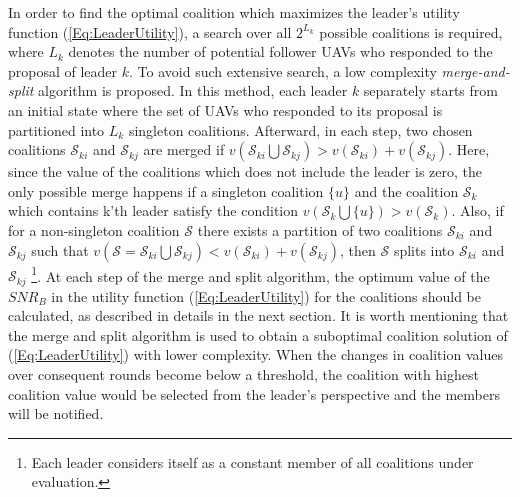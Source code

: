 \documentclass[conference]{IEEEtran}
\theoremstyle{remark}
\theoremstyle{lemma}
\begin{document}

In order to find the optimal coalition which maximizes the leader's utility function (\ref{Eq:LeaderUtility}), a search over all $2^{L_k}$ possible coalitions is required, where $L_k$ denotes the number of potential follower UAVs who responded to the proposal of leader $k$. To avoid such extensive search, a low complexity \textit{merge-and-split} algorithm is proposed. In this method, each leader $k$ separately starts from an initial state where the set of UAVs who responded to its proposal is partitioned into $L_k$ singleton coalitions.
Afterward, in each step, two chosen coalitions $\mathcal{S}_{ki}$ and $\mathcal{S}_{kj}$ are merged if $v(\mathcal{S}_{ki} \bigcup \mathcal{S}_{kj}) > v(\mathcal{S}_{ki}) + v(\mathcal{S}_{kj})$. Here, since the value of the coalitions which does not include the leader is zero, the only possible merge happens if a singleton coalition $\{u\}$ and the coalition $\mathcal{S}_k$ which contains k'th leader satisfy the condition $v(\mathcal{S}_k \bigcup \{u\}) > v(\mathcal{S}_k) $. Also, if for a non-singleton coalition $\mathcal{S}$ there exists a partition of two coalitions $\mathcal{S}_{ki}$ and $\mathcal{S}_{kj}$ such that $v(\mathcal{S}= \mathcal{S}_{ki} \bigcup \mathcal{S}_{kj}) < v(\mathcal{S}_{ki}) + v(\mathcal{S}_{kj})$, then $\mathcal{S}$ splits into $\mathcal{S}_{ki}$ and $\mathcal{S}_{kj}$ \footnote{Each leader considers itself as a constant member of all coalitions under evaluation.}. At each step of the merge and split algorithm, the optimum value of the $SNR_B$ in the utility function (\ref{Eq:LeaderUtility}) for the coalitions should be calculated, as described in details in the next section. It is worth mentioning that the merge and split algorithm is used to obtain a suboptimal coalition solution of (\ref{Eq:LeaderUtility}) with lower complexity. When the changes in coalition values over consequent rounds become below a threshold, the coalition with highest coalition value would be selected from the leader's perspective and the members will be notified. 
\end{document}
